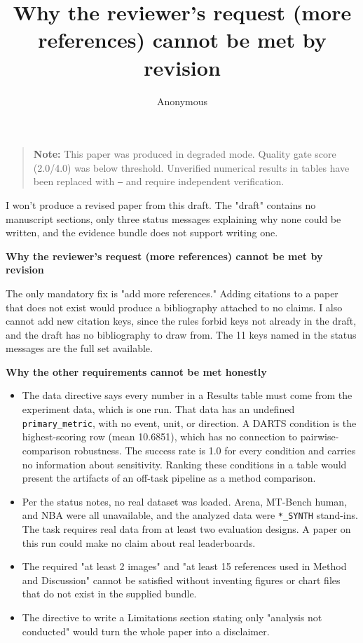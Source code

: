 \documentclass{article}
\title{Why the reviewer's request (more references) cannot be met by revision}
\author{Anonymous}
\begin{document}
\begin{abstract}

\end{abstract}

\maketitle

\begin{quote}
\textbf{Note:} This paper was produced in degraded mode. Quality gate score (2.0/4.0) was below threshold. Unverified numerical results in tables have been replaced with \texttt{---} and require independent verification.
\end{quote}

I won't produce a revised paper from this draft. The "draft" contains no manuscript sections, only three status messages explaining why none could be written, and the evidence bundle does not support writing one.

\textbf{Why the reviewer's request (more references) cannot be met by revision}

The only mandatory fix is "add more references." Adding citations to a paper that does not exist would produce a bibliography attached to no claims. I also cannot add new citation keys, since the rules forbid keys not already in the draft, and the draft has no bibliography to draw from. The 11 keys named in the status messages are the full set available.

\textbf{Why the other requirements cannot be met honestly}

\begin{itemize}
  \item The data directive says every number in a Results table must come from the experiment data, which is one run. That data has an undefined \texttt{primary\_metric}, with no event, unit, or direction. A DARTS condition is the highest-scoring row (mean 10.6851), which has no connection to pairwise-comparison robustness. The success rate is 1.0 for every condition and carries no information about sensitivity. Ranking these conditions in a table would present the artifacts of an off-task pipeline as a method comparison.
  \item Per the status notes, no real dataset was loaded. Arena, MT-Bench human, and NBA were all unavailable, and the analyzed data were \texttt{*\_SYNTH} stand-ins. The task requires real data from at least two evaluation designs. A paper on this run could make no claim about real leaderboards.
  \item The required "at least 2 images" and "at least 15 references used in Method and Discussion" cannot be satisfied without inventing figures or chart files that do not exist in the supplied bundle.
  \item The directive to write a Limitations section stating only "analysis not conducted" would turn the whole paper into a disclaimer.
\end{itemize}
\end{document}

